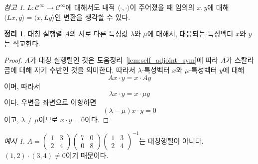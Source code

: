 \documentclass[unfonts,oneside,a4paper]{oblivoir}
\theoremstyle{definition}
\theoremstyle{theorem}
\newtheorem{theorem}{정리}[section]
\theoremstyle{theorem}
\theoremstyle{remark}
\newtheorem*{remark}{참고}
\theoremstyle{remark}
\theoremstyle{remark}
\newtheorem*{example}{예시}
\theoremstyle{remark}
\renewcommand{\vec}[1]{\bm{\mathit{#1}}}
\begin{document}
\begin{remark}
    $L: \mathcal C^\infty \rightarrow \mathcal C^\infty$에 대해서도 내적 $\langle \cdot, \cdot \rangle$이 주어졌을 때 임의의 $x, y$에 대해 $\langle L x, y \rangle = \langle x, Ly \rangle$인 변환을 생각할 수 있다.
\end{remark}

\begin{theorem} \label{thm:sym_eigenvector_orthogonal}
    대칭 실행렬 $A$의 서로 다른 특성값 $\lambda$와 $\mu$에 대해서, 대응되는 특성벡터 $\vec x$와 $\vec y$는 직교한다.
\end{theorem}

\begin{proof}
    $A$가 대칭 실행렬인 것은 도움정리~\ref{lem:self_adjoint_sym}에 따라 $A$가 스칼라곱에 대해 자기 수반인 것을 의미한다.
    따라서 $\lambda$-특성벡터 $\vec x$와 $\mu$-특성벡터 $\vec y$에 대해
    \begin{equation*}
        A \vec x \cdot \vec y = \vec x \cdot A \vec y
    \end{equation*}
    이며, 따라서
    \begin{equation*}
        \lambda \vec x \cdot \vec y = \vec x \cdot \mu \vec y
    \end{equation*}
    이다.
    우변을 좌변으로 이항하면
    \begin{equation*}
        (\lambda - \mu) \vec x \cdot \vec y = 0
    \end{equation*}
    이고, $\lambda \neq \mu$이므로 $\vec x \cdot \vec y = 0$이다.
\end{proof}

\begin{example}
    $A = \begin{pmatrix}1 & 3\\2 & 4\end{pmatrix} \begin{pmatrix}7 & 0\\ 0 & 8\end{pmatrix}\begin{pmatrix}1 & 3\\2 & 4\end{pmatrix}^{-1}$는 대칭행렬이 아니다.
    $(1, 2) \cdot (3, 4) \neq 0$이기 때문이다.
\end{example}
\end{document}
